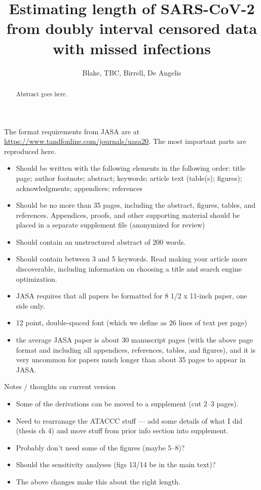\documentclass[12pt, letterpaper]{article} %
\begin{document}
\title{Estimating length of SARS-CoV-2 from doubly interval censored data with missed infections}
\author{Blake, TBC, Birrell, De Angelis}
\maketitle

\begin{abstract}
Abstract goes here.
\end{abstract}

The format requirements from JASA are at \url{https://www.tandfonline.com/journals/uasa20}.
The most important parts are reproduced here.
\begin{itemize}
    \item Should be written with the following elements in the following order: title page; author footnote; abstract; keywords; article text (table(s); figures); acknowledgments; appendices; references
    \item Should be no more than 35 pages, including the abstract, figures, tables, and references. Appendices, proofs, and other supporting material should be placed in a separate supplement file (anonymized for review)
    \item Should contain an unstructured abstract of 200 words.
    \item Should contain between 3 and 5 keywords. Read making your article more discoverable, including information on choosing a title and search engine optimization.
    \item JASA requires that all papers be formatted for 8 1/2 x 11-inch paper, one side only.
    \item 12 point, double-spaced font (which we define as 26 lines of text per page)
    \item the average JASA paper is about 30 manuscript pages (with the above page format and including all appendices, references, tables, and figures), and it is very uncommon for papers much longer than about 35 pages to appear in JASA. 
\end{itemize}

Notes / thoughts on current version
\begin{itemize}
    \item Some of the derivations can be moved to a supplement (cut 2--3 pages).
    \item Need to rearranage the ATACCC stuff --- add some details of what I did (thesis ch 4) and move stuff from prior info section into supplement.
    \item Probably don't need some of the figures (maybe 5--8)?
    \item Should the sensitivity analyses (figs 13/14 be in the main text)?
    \item The above changes make this about the right length.
\end{itemize}
\end{document}
